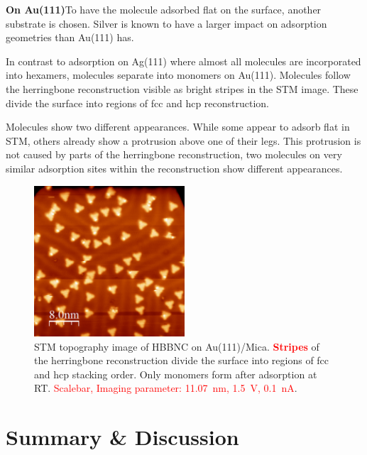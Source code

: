 \textbf{On Au(111)}To have the molecule adsorbed flat on the surface, another substrate is chosen. Silver is known to have a larger impact on adsorption geometries than Au(111) has.

In contrast to adsorption on Ag(111) where almost all molecules are incorporated into hexamers, molecules separate into monomers on Au(111). Molecules follow the herringbone reconstruction visible as bright stripes in the STM image. These divide the surface into regions of fcc and hcp reconstruction.

Molecules show two different appearances. While some appear to adsorb flat in STM, others already show a protrusion above one of their legs. This protrusion is not caused by parts of the herringbone reconstruction, two molecules on very similar adsorption sites within the reconstruction show different appearances.

\begin{figure}[] \centering
	\includegraphics[width=0.5\textwidth]{./images/hbbnc-au-111-rt}
	\caption{STM topography image of HBBNC on Au(111)/Mica. \textcolor{red}{\textbf{Stripes}} of the herringbone reconstruction divide the surface into regions of fcc and hcp stacking order. Only monomers form after adsorption at RT. \textcolor{red}{Scalebar, Imaging parameter: \SI{11.07}{\nano \meter}, \SI{1.5}{\volt}, \SI{0.1}{\nano \ampere}}.}
	\label{}
\end{figure}

\section{Summary \& Discussion}

